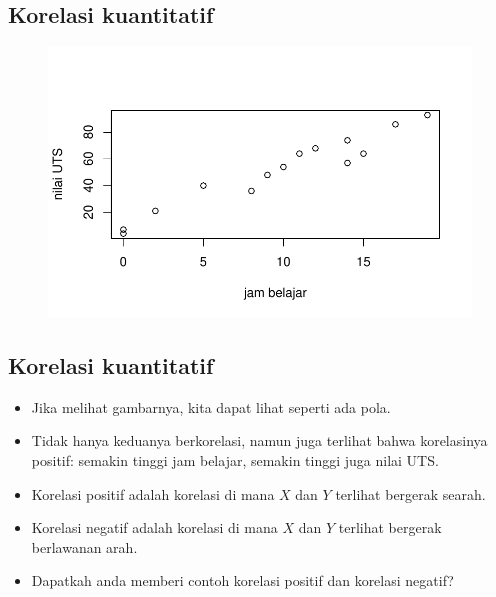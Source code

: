 \documentclass[
  letterpaper,
  DIV=11,
  numbers=noendperiod]{scrartcl}
\newenvironment{Shaded}{\begin{snugshade}}{\end{snugshade}}
\newcommand{\AttributeTok}[1]{\textcolor[rgb]{0.40,0.45,0.13}{#1}}
\newcommand{\FunctionTok}[1]{\textcolor[rgb]{0.28,0.35,0.67}{#1}}
\newcommand{\NormalTok}[1]{\textcolor[rgb]{0.00,0.23,0.31}{#1}}
\newcommand{\OtherTok}[1]{\textcolor[rgb]{0.00,0.23,0.31}{#1}}
\newcommand{\SpecialCharTok}[1]{\textcolor[rgb]{0.37,0.37,0.37}{#1}}
\newcommand{\StringTok}[1]{\textcolor[rgb]{0.13,0.47,0.30}{#1}}
\begin{document}
\hypertarget{korelasi-kuantitatif-3}{%
\subsection{Korelasi kuantitatif}\label{korelasi-kuantitatif-3}}

\begin{Shaded}
\end{Shaded}

\begin{figure}[H]

{\centering \includegraphics{index_files/figure-pdf/unnamed-chunk-20-1.pdf}

}

\end{figure}

\hypertarget{korelasi-kuantitatif-4}{%
\subsection{Korelasi kuantitatif}\label{korelasi-kuantitatif-4}}

\begin{itemize}
\item
  Jika melihat gambarnya, kita dapat lihat seperti ada pola.
\item
  Tidak hanya keduanya berkorelasi, namun juga terlihat bahwa
  korelasinya positif: semakin tinggi jam belajar, semakin tinggi juga
  nilai UTS.
\item
  Korelasi positif adalah korelasi di mana \(X\) dan \(Y\) terlihat
  bergerak searah.
\item
  Korelasi negatif adalah korelasi di mana \(X\) dan \(Y\) terlihat
  bergerak berlawanan arah.
\item
  Dapatkah anda memberi contoh korelasi positif dan korelasi negatif?
\end{itemize}
\end{document}
